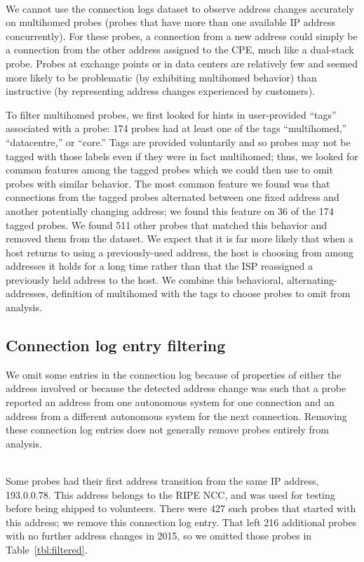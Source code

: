 \par {}\\ We cannot use
the connection logs dataset to observe address changes accurately on multihomed
probes (probes that have more than
one available IP address concurrently). For these probes, a connection from a new
address could simply be a connection from the other address
assigned to the CPE, much like a dual-stack probe.  Probes
at exchange points or in data centers are relatively few and
seemed more likely to be problematic (by exhibiting
multihomed behavior) than instructive (by representing
address changes experienced by customers).

To filter multihomed probes, we first looked for hints in
user-provided ``tags'' associated with a probe: 174 probes
had at least one of the tags ``multihomed,'' ``datacentre,'' or ``core.''
Tags are provided voluntarily and so probes may not be
tagged with those labels even if they were in fact
multihomed; thus, we looked for common features among the
tagged probes which we could then use to omit probes with
similar behavior. The most common feature we found was that
connections from the tagged probes alternated between one
fixed address and another potentially changing address; we
found this feature on 36 of the 174 tagged probes. We
found 511 other probes that matched this behavior and
removed them from the dataset. We expect that it is far more
likely that when a host returns to using a previously-used
address, the host is choosing from among 
addresses it holds for a long time rather than that the ISP reassigned a
previously held address to the host.  We combine this behavioral,
alternating-addresses, definition of multihomed with the tags
to choose probes to omit from analysis.


\subsection{Connection log entry filtering}

We omit some entries in the connection log because of
properties of either the address involved or because the detected address
change was such that a probe reported an address from one autonomous system
for one connection and an address from a different
autonomous system for the next connection. 
Removing these connection log entries does not generally
remove probes entirely from analysis.

\par {}\\ 
Some probes had their first address transition from the same IP
address, 193.0.0.78.  This address belongs to the RIPE NCC, and
was used for testing before being shipped to volunteers.
There were 427 such probes that started with this address; we
remove this connection log entry.  That left 216 additional probes 
with no further address changes in 2015, so we omitted those probes
in Table~\ref{tbl:filtered}.

